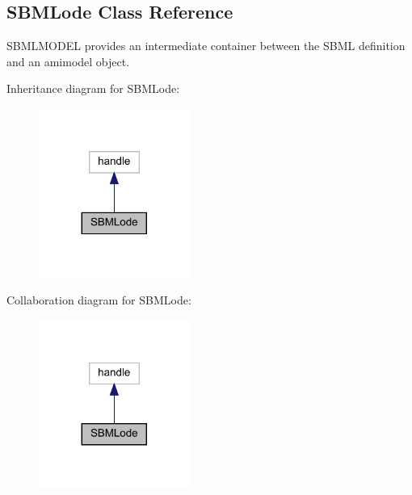 \hypertarget{class_s_b_m_lode}{}\subsection{S\+B\+M\+Lode Class Reference}
\label{class_s_b_m_lode}


S\+B\+M\+L\+M\+O\+D\+EL provides an intermediate container between the S\+B\+ML definition and an amimodel object.  




Inheritance diagram for S\+B\+M\+Lode\+:\nopagebreak
\begin{figure}[H]
\begin{center}
\leavevmode
\includegraphics[width=140pt]{class_s_b_m_lode__inherit__graph}
\end{center}
\end{figure}


Collaboration diagram for S\+B\+M\+Lode\+:\nopagebreak
\begin{figure}[H]
\begin{center}
\leavevmode
\includegraphics[width=140pt]{class_s_b_m_lode__coll__graph}
\end{center}
\end{figure}
